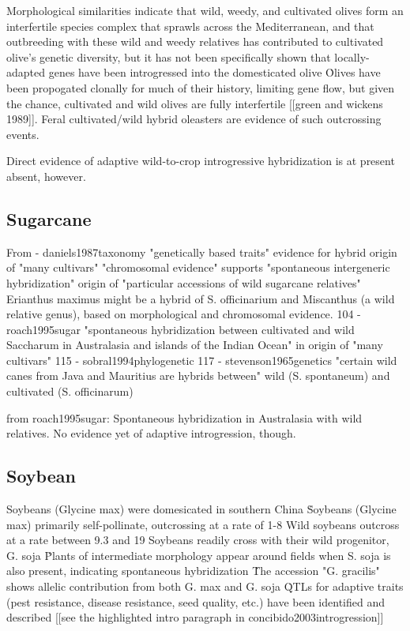 \documentclass[11pt]{article}
\begin{document}
Morphological similarities indicate that wild, weedy, and cultivated olives form an interfertile species complex that sprawls across the Mediterranean, and that outbreeding with these wild and weedy relatives has contributed to cultivated olive's genetic diversity, but it has not been specifically shown that locally-adapted genes have been introgressed into the domesticated olive \cite{zohary1975beginnings}\.

Olives have been propogated clonally for much of their history, limiting gene flow, but given the chance, cultivated and wild olives are fully interfertile [[green and wickens 1989]].
Feral cultivated/wild hybrid oleasters are evidence of such outcrossing events.

Direct evidence of adaptive wild-to-crop introgressive hybridization is at present absent, however.




\subsection*{Sugarcane}

From \cite{ellstrand1999gene} - daniels1987taxonomy
 "genetically based traits" evidence for hybrid origin of "many cultivars"
 "chromosomal evidence" supports "spontaneous intergeneric hybridization" origin of "particular accessions of wild sugarcane relatives"
 Erianthus maximus might be a hybrid of S. officinarium and Miscanthus (a wild relative genus), based on morphological and chromosomal evidence.
104 - roach1995sugar
 "spontaneous hybridization between cultivated and wild Saccharum in Australasia and islands of the Indian Ocean" in origin of "many cultivars"
115 - sobral1994phylogenetic
117 - stevenson1965genetics
 "certain wild canes from Java and Mauritius are hybrids between" wild (S. spontaneum) and cultivated (S. officinarum)
 
 from roach1995sugar:
 Spontaneous hybridization in Australasia with wild relatives.
 No evidence yet of adaptive introgression, though.






\subsection*{Soybean}

Soybeans (Glycine max) were domesicated in southern China \cite{guo2010single}\.
Soybeans (Glycine max) primarily self-pollinate, outcrossing at a rate of 1-8%
Wild soybeans outcross at a rate between 9.3 and 19%
Soybeans readily cross with their wild progenitor, G. soja \cite{singh1988genomic}\.
Plants of intermediate morphology appear around fields when S. soja is also present, indicating spontaneous hybridization \cite{kwon1972studies}\.
The accession "G. gracilis" shows allelic contribution from both G. max and G. soja \cite{keim1989restriction}\.
QTLs for adaptive traits (pest resistance, disease resistance, seed quality, etc.) have been identified and described [[see the highlighted intro paragraph in concibido2003introgression]]
\end{document}
